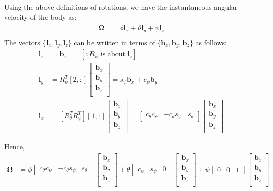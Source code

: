 Using the above definitions of rotations, we have the instantaneous angular velocity of the body as:
\begin{align*}
    \pmb \Omega &= \dot \phi \pmb l_x + \dot \theta \pmb l_y + \dot \psi \pmb l_z\\
\end{align*}
The vectors $\{ \pmb l_x, \pmb l_y, \pmb l_z\}$ can be written in terms of $\{ \pmb b_x, \pmb b_y, \pmb b_z\}$ as follows:
\begin{align*}
    \pmb l_z &= \pmb b_z \qquad [\because R_{\psi} \text{ is about } \pmb l_z]\\
    \pmb l_y &= R_{\psi}^T [2, :]\begin{bmatrix}
    \pmb b_x \\ \pmb b_y \\ \pmb b_z\\
\end{bmatrix} = s_{\psi} \pmb b_x + c_{\psi} \pmb b_y\\
    \pmb l_x &= [R_{\theta}^T R_{\psi}^T][1,:] \begin{bmatrix}
    \pmb b_x \\ \pmb b_y \\ \pmb b_z\\
\end{bmatrix} = \begin{bmatrix}
    c_{\theta}c_{\psi} & -c_{\theta}s_{\psi} & s_{\theta}
\end{bmatrix}\begin{bmatrix}
    \pmb b_x \\ \pmb b_y \\ \pmb b_z\\
\end{bmatrix}
\end{align*}

Hence,
\begin{align*}
    \pmb \Omega &=
        \dot \phi \begin{bmatrix} c_{\theta}c_{\psi} & -c_{\theta}s_{\psi} &
        s_{\theta} \end{bmatrix}\begin{bmatrix} \pmb b_x \\ \pmb b_y \\ \pmb
        b_z\\\end{bmatrix} +
        \dot \theta \begin{bmatrix} c_{\psi} & s_{\psi} & 0
        \end{bmatrix}\begin{bmatrix} \pmb b_x \\ \pmb b_y \\ \pmb
        b_z\\\end{bmatrix} +
        \dot \psi \begin{bmatrix} 0 & 0 & 1\end{bmatrix}
        \begin{bmatrix} \pmb b_x \\ \pmb b_y \\ \pmb
        b_z\\\end{bmatrix}
\end{align*}

